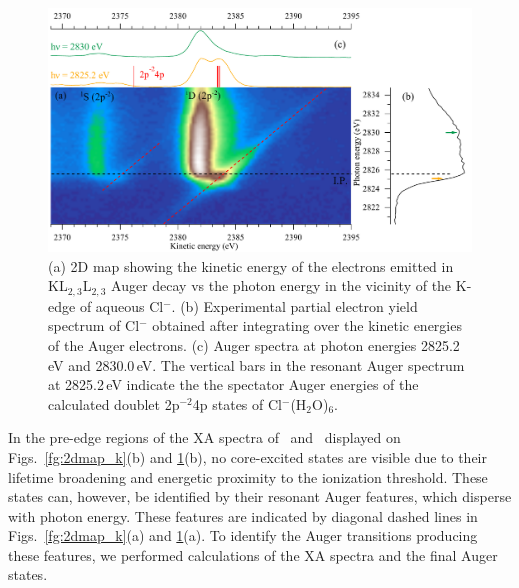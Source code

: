 \begin{figure}[h!]
\centering
\includegraphics[scale=0.55]{figures/cl_2dmap.pdf}
\caption{(a) 2D map showing the kinetic energy of the electrons emitted in
KL$_{2,3}$L$_{2,3}$ Auger decay vs the photon energy in the vicinity of the
K-edge of aqueous Cl$^{-}$. 
(b) Experimental partial electron yield spectrum of Cl$^{-}$ obtained after
integrating over the kinetic energies of the Auger electrons. 
(c) Auger spectra at photon energies 2825.2\,eV and 2830.0\,eV. The vertical
bars in the resonant Auger spectrum at 2825.2\,eV indicate the the spectator
Auger energies of the calculated doublet 2p$^{-2}$4p states of Cl$^{-}$(H$_2$O)$_6$.}
\label{fg:2dmap_cl}
\end{figure}

{\color{blue} In the pre-edge regions of the XA spectra of \ki~and \cli~displayed on Figs.\ \ref{fg:2dmap_k}(b) and \ref{fg:2dmap_cl}(b), no core-excited states are visible due to their lifetime broadening and energetic proximity to the ionization threshold. These states can, however, be identified by their resonant Auger features, which disperse with photon energy. These features are indicated by diagonal dashed lines in Figs.\ \ref{fg:2dmap_k}(a) and \ref{fg:2dmap_cl}(a). To identify the Auger transitions producing these features, we performed calculations of the XA spectra and the final Auger states.}

